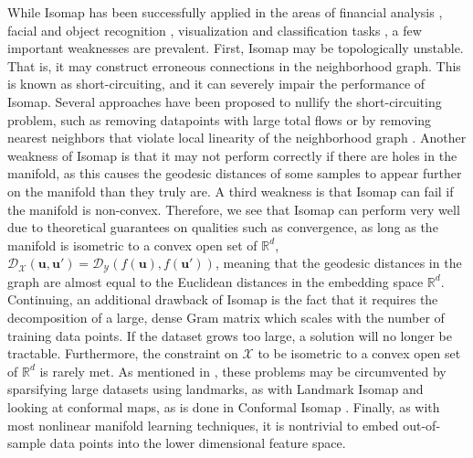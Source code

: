 While Isomap has been successfully applied in the areas of financial analysis \citep{Ribeiro2008SupervisedIsomap}, facial and object recognition \citep{Zhang2018IsomapMultiManifold}, visualization and classification tasks \citep{Vlachos2002NonlinearDRClassification}, a few important weaknesses are prevalent.  First, Isomap may be topologically unstable.  That is, it may construct erroneous connections in the neighborhood graph.  This is known as short-circuiting, and it can severely impair the performance  of Isomap.  Several approaches have been proposed to nullify the short-circuiting problem, such as removing datapoints with large total flows or by removing nearest neighbors that violate local linearity of the neighborhood graph \citep{VanDerMaaten2009DRReview}.  Another weakness of Isomap is that it may not perform correctly if there are holes  in the manifold, as this causes the geodesic distances of some samples to appear further on the manifold than  they truly are.  A third weakness is that Isomap can fail if the manifold is non-convex.  Therefore, we see that Isomap can perform very well due to theoretical guarantees on qualities such as convergence, as long as the manifold  is isometric to a convex open set of $\mathbb{R}^{d}$, $\mathcal{D}_{\mathcal{X}}(\bm{u},\bm{u}') = \mathcal{D}_{\mathcal{Y}}(f(\bm{u}),f(\bm{u}')) $, meaning that the geodesic distances in the graph are almost equal to the Euclidean distances in the embedding space $\mathbb{R}^{d}$.  Continuing, an additional drawback of Isomap is the fact that it requires the decomposition of a large, dense Gram matrix which scales with the number of training data points.  If the dataset grows too large, a solution will no longer be tractable.  Furthermore, the constraint on $\mathcal{X}$ to be isometric to a convex open set of $\mathbb{R}^{d}$ is rarely met.  As mentioned in \citep{Thorstensen2009ManifoldThesis}, these problems may be circumvented by sparsifying  large datasets using landmarks, as with Landmark Isomap \citep{deSilva2002IsomapReview} and looking at conformal maps, as is done in Conformal Isomap \citep{deSilva2002ConformalIsomap}. Finally, as with most nonlinear manifold learning techniques, it is nontrivial to embed out-of-sample data points into the lower dimensional feature space.  

